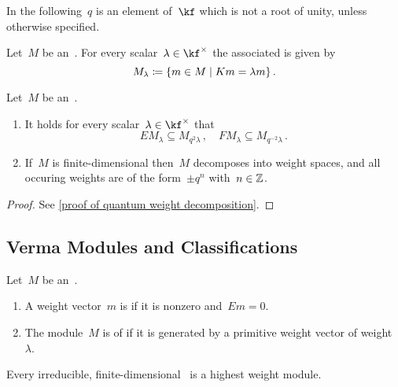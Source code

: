 \documentclass[a4paper, 11pt, oneside]{scrartcl}
\begin{document}
\begin{convention}
  In the following~$q$ is an element of~$\kf$ which is not a root of unity, unless otherwise specified.
\end{convention}

\begin{definition}
  Let~$M$ be an~.
  For every scalar~$\lambda \in \kf^{\times}$ the associated  is given by
  \[
    M_\lambda
    \defined
    \{
      m \in M
    \suchthat
      K m = \lambda m
    \} \,.
  \]
\end{definition}

\begin{theorem}
  \label{quantum weight decomposition}
  Let~$M$ be an~.
  \begin{enumerate}
    \item
      It holds for every scalar~$\lambda \in \kf^{\times}$ that
      \[
        E M_\lambda \subseteq M_{q^2 \lambda} \,,
        \quad
        F M_\lambda \subseteq M_{q^{-2} \lambda} \,.
      \]
    \item
      If~$M$ is finite-dimensional then~$M$ decomposes into weight spaces, and all occuring weights are of the form~$\pm q^n$ with~$n \in \mathbb{Z}$.
  \end{enumerate}
\end{theorem}

\begin{proof}
  See \cref{proof of quantum weight decomposition}.
\end{proof}



\subsection{Verma Modules and Classifications}

\begin{definition}
  Let~$M$ be an~.
  \begin{enumerate}
    \item
      A weight vector~$m$ is  if it is nonzero and~$Em = 0$.
    \item
      The module~$M$ is of  if it is generated by a primitive weight vector of weight~$\lambda$.
  \end{enumerate}
\end{definition}

\begin{proposition}
  Every irreducible, finite-dimensional~ is a highest weight module.
\end{proposition}
\end{document}
